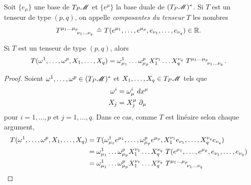 \documentclass[a4paper,11pt]{report}
\begin{document}
                \begin{definition}
                    Soit $\{e_\mu\}$ une base de $T_P\mathscr{M}$ et $\{e^\mu\}$ la base duale de $(T_P\mathscr{M})^*$. Si $T$ est un tenseur de type $(p,q)$, on appelle \textit{composantes du tenseur} $T$ les nombres
                    \begin{equation}
                        T\indices{^{\mu_1\dots\mu_p}_{\nu_1\dots\nu_q}}~\hat{=}~T(e^{\mu_1},\dots,e^{\mu_p},e_{\nu_1},\dots,e_{\nu_q})\in\mathbb{R}.
                    \end{equation}
                \end{definition}
                
                \begin{prop}\begin{leftbar}
                    Si $T$ est un tenseur de type $(p,q)$, alors
                    \begin{equation}
                        T(\omega^1,\dots,\omega^p,X_1,\dots,X_q) = \omega^1_{\mu_1}\dots\omega^p_{\mu_p}X^{\nu_1}_1\dots X^{\nu_q}_q~ T\indices{^{\mu_1\dots\mu_p}_{\nu_1\dots\nu_q}}.
                    \end{equation}
                \end{leftbar}\end{prop}
                
                \begin{proof}
                    Soient $\omega^1,\dots,\omega^p\in(T_P\mathscr{M})^*$ et $X_1,\dots,X_q\in T_P\mathscr{M}$ tels que 
                    \begin{align}
                        \omega^i &= \omega^i_\mu ~dx^\mu \\
                        X_j &= X^\mu_j~\partial_\mu
                    \end{align}
                    pour $i=1,\dots,p$ et $j=1,\dots,q$. Dans ce cas, comme $T$ est linéaire selon chaque argument,
                    \begin{align}
                        T(\omega^1,\dots,\omega^p,X_1,\dots,X_q) &= T(\omega^1_{\mu_1}e^{\mu_1},\dots,\omega^p_{\mu_p}e^{\mu_p},X^{\nu_1}_1e_{\nu_1},\dots,X^{\nu_q}_qe_{\nu_q}) \\
                        &=\omega^1_{\mu_1}\dots\omega^p_{\mu_p}X^{\nu_1}_1\dots X^{\nu_q}_q~T(e^{\mu_1},\dots,e^{\mu_p},e_{\nu_1},\dots,e_{\nu_q}) \\
                        &= \omega^1_{\mu_1}\dots\omega^p_{\mu_p}X^{\nu_1}_1\dots X^{\nu_q}_q~ T\indices{^{\mu_1\dots\mu_p}_{\nu_1\dots\nu_q}}
                    \end{align}
                \end{proof}
                
\end{document}
